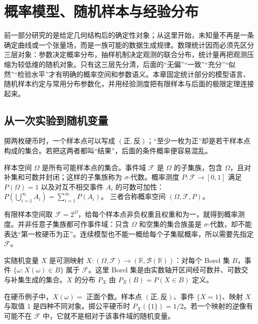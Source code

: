 \chapter{概率模型、随机样本与经验分布}\label{chap:math-stat-models} \label{chap:math-probability}

前一部分研究的是给定几何结构后的确定性对象；从这里开始，未知量不再是一条确定曲线或一个张量场，而是一族可能的数据生成规律。数理统计因而必须先区分三层对象：参数决定概率分布，抽样机制决定观测的联合分布，统计量再把观测压缩为较低维的随机对象。只有这三层先分清，后面的“无偏”“一致”“充分”“似然”“检验水平”才有明确的概率空间和参数语义。本章固定统计部分的模型语言、随机样本约定与常用分布参数化，并用经验测度把有限样本与后面的极限定理连接起来。

\section{从一次实验到随机变量}

掷两枚硬币时，一个样本点可以写成 \((\text{正},\text{反})\)；“至少一枚为正”却是若干样本点构成的集合。若把这两者都叫“结果”，后面的条件概率便容易混乱。

\begin{definition}[概率空间]
样本空间 \(\Omega\) 是所有可能样本点的集合。事件域 \(\mathcal F\) 是 \(\Omega\) 的子集族，包含 \(\Omega\)，且对补集和可数并封闭；这样的子集族称为 \(\sigma\)-代数。概率测度 \(P:\mathcal F\to[0,1]\) 满足 \(P(\Omega)=1\) 以及对互不相交事件 \(A_i\) 的可数可加性：
\(P(\bigcup_{i=1}^\infty A_i)=\sum_{i=1}^\infty P(A_i)\)。
三者合称概率空间 \((\Omega,\mathcal F,P)\)。
\end{definition}

有限样本空间取 \(\mathcal F=2^\Omega\)，给每个样本点非负权重且权重和为一，就得到概率测度。并非任意子集族都可作事件域：只含 \(\Omega\) 和空集的集合族虽是 \(\sigma\)-代数，却不能表达“第一枚硬币为正”。连续模型也不能一概给每个子集赋概率，所以需要先指定 \(\mathcal F\)。

\begin{definition}[随机变量及其分布]
实随机变量 \(X\) 是可测映射 \(X:(\Omega,\mathcal F)\to(\mathbb R,\mathcal B(\mathbb R))\)：对每个 Borel 集 \(B\)，事件 \(\{\omega:X(\omega)\in B\}\) 属于 \(\mathcal F\)。这里 Borel 集是由实数轴开区间经可数并、可数交与补集生成的集合。\(X\) 的分布 \(P_X\) 由 \(P_X(B)=P(X\in B)\) 定义。
\end{definition}

在硬币例子中，\(X(\omega)=\) 正面个数。样本点 \((\text{正},\text{反})\)、事件 \(\{X=1\}\)、映射 \(X\) 与取值 \(1\) 是四种不同对象。掷公平硬币时 \(P_X(\{1\})=1/2\)。若一个映射的逆像有可能不在 \(\mathcal F\) 中，它就不是相对于该事件域的随机变量。

